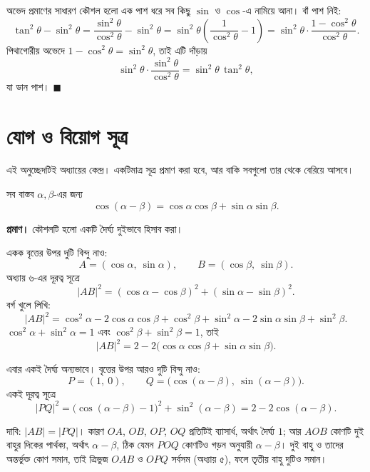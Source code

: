\documentclass[11pt]{article}
\begin{document}
\begin{solbox}
অভেদ প্রমাণের সাধারণ কৌশল হলো এক পাশ ধরে সব কিছু $\sin$ ও $\cos$-এ নামিয়ে আনা।
বাঁ পাশ নিই:
\[
  \tan^2\theta - \sin^2\theta
  = \frac{\sin^2\theta}{\cos^2\theta} - \sin^2\theta
  = \sin^2\theta \left( \frac{1}{\cos^2\theta} - 1 \right)
  = \sin^2\theta \cdot \frac{1 - \cos^2\theta}{\cos^2\theta} .
\]
পিথাগোরীয় অভেদে $1 - \cos^2\theta = \sin^2\theta$, তাই এটি দাঁড়ায়
\[
  \sin^2\theta \cdot \frac{\sin^2\theta}{\cos^2\theta}
  = \sin^2\theta \, \tan^2\theta ,
\]
যা ডান পাশ। $\blacksquare$
\end{solbox}

\section{যোগ ও বিয়োগ সূত্র}

এই অনুচ্ছেদটিই অধ্যায়ের কেন্দ্র। একটিমাত্র সূত্র প্রমাণ করা হবে, আর বাকি
সবগুলো তার থেকে বেরিয়ে আসবে।

\begin{idea}[বিয়োগ সূত্র]
সব বাস্তব $\alpha, \beta$-এর জন্য
\[
  \cos(\alpha - \beta) = \cos\alpha \cos\beta + \sin\alpha \sin\beta .
\]
\end{idea}

\noindent
\textbf{প্রমাণ।} কৌশলটি হলো একটি দৈর্ঘ্য দুইভাবে হিসাব করা।

একক বৃত্তের উপর দুটি বিন্দু নাও:
\[
  A = (\cos\alpha,\ \sin\alpha), \qquad B = (\cos\beta,\ \sin\beta) .
\]
অধ্যায় ৬-এর দূরত্ব সূত্রে
\[
  |AB|^2 = (\cos\alpha - \cos\beta)^2 + (\sin\alpha - \sin\beta)^2 .
\]
বর্গ খুলে লিখি:
\[
  |AB|^2 = \cos^2\alpha - 2\cos\alpha\cos\beta + \cos^2\beta
         + \sin^2\alpha - 2\sin\alpha\sin\beta + \sin^2\beta .
\]
$\cos^2\alpha + \sin^2\alpha = 1$ এবং $\cos^2\beta + \sin^2\beta = 1$, তাই
\[
  |AB|^2 = 2 - 2\big( \cos\alpha\cos\beta + \sin\alpha\sin\beta \big) . \tag{i}
\]

এবার একই দৈর্ঘ্য অন্যভাবে। বৃত্তের উপর আরও দুটি বিন্দু নাও:
\[
  P = (1,\ 0), \qquad Q = \big( \cos(\alpha - \beta),\ \sin(\alpha-\beta) \big) .
\]
একই দূরত্ব সূত্রে
\[
  |PQ|^2 = \big( \cos(\alpha-\beta) - 1 \big)^2 + \sin^2(\alpha-\beta)
         = 2 - 2\cos(\alpha - \beta) . \tag{ii}
\]

দাবি: $|AB| = |PQ|$। কারণ $OA$, $OB$, $OP$, $OQ$ প্রতিটিই ব্যাসার্ধ, অর্থাৎ
দৈর্ঘ্য $1$; আর $AOB$ কোণটি দুই বাহুর দিকের পার্থক্য, অর্থাৎ $\alpha - \beta$,
ঠিক যেমন $POQ$ কোণটিও গড়ন অনুযায়ী $\alpha - \beta$। দুই বাহু ও তাদের
অন্তর্ভুক্ত কোণ সমান, তাই ত্রিভুজ $OAB$ ও $OPQ$ সর্বসম (অধ্যায় ৫), ফলে
তৃতীয় বাহু দুটিও সমান।
\end{document}
